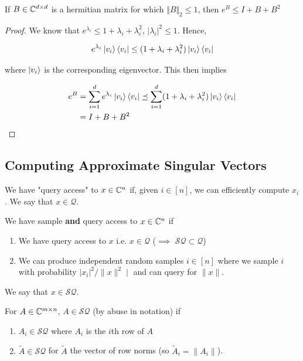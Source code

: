 \documentclass[main.tex]{subfiles}
\begin{document}
\begin{lemma}
\label{lemma:exp-eigen-approx}
If $B \in \mathbb{C}^{d \times d}$ is a hermitian matrix for which $\Vert B \Vert_2 \leq 1$, then $e^{B} \leq I + B + B^2$

\begin{proof}
	We know that $e^{\lambda_i} \leq 1 + \lambda_i + \lambda_i^2$, $|\lambda_i|^2 \leq 1$. Hence,
	
	\begin{align*}
	e^{\lambda_i} \ket{v_i}\bra{v_i} \leq (1 + \lambda_i + \lambda_i^2) 	\ket{v_i}\bra{v_i}
	\end{align*}

	where $\ket{v_i}$ is the corresponding eigenvector. This then implies
	
	\begin{align*}
	e^B &= \sum_{i=1}^d e^{\lambda_i} \ket{v_i}\bra{v_i} \preceq \sum_{i=1}^d (1 + \lambda_i + \lambda_i^2) \ket{v_i}\bra{v_i} \\
	&= I + B + B^2
	\end{align*}
\end{proof}
\end{lemma}


\subsection{Computing Approximate Singular Vectors}
\label{sec:approx-sing-vec}

\begin{definition}
We have "query access" to $x \in \mathbb{C}^n$ if, given $i \in [n]$, we can efficiently compute $x_i$. We say that $x \in \mathcal{Q}$.
\end{definition}
\begin{definition} We have sample \textbf{and} query access to $x \in \mathbb{C}^n$ if 

\begin{enumerate}
\item We have query access to $x$ i.e. $x\in \mathcal{Q}$ ($\implies$ $\mathcal{SQ} \subset \mathcal{Q}$)
\item We can produce independent random samples $i \in [n]$ where we sample $i$ with probability $|x_i|^2/\|x\|^2∣$ and can query for $\|x\|$.
\end{enumerate}
We say that $x \in \mathcal{SQ}$. 
\end{definition}
\begin{definition} For $A \in \mathbb{C}^{m\times n}$, $A \in \mathcal{SQ}$ (by abuse in notation) if

\begin{enumerate}
\item $A_i \in \mathcal{SQ}$ where $A_i$ is the $i$th row of $A$
\item $\tilde{A} \in \mathcal{SQ}$ for $\tilde{A}$ the vector of row norms (so $\tilde{A}_i = \|A_i\|$).	
\end{enumerate}
\end{definition}
\end{document}
